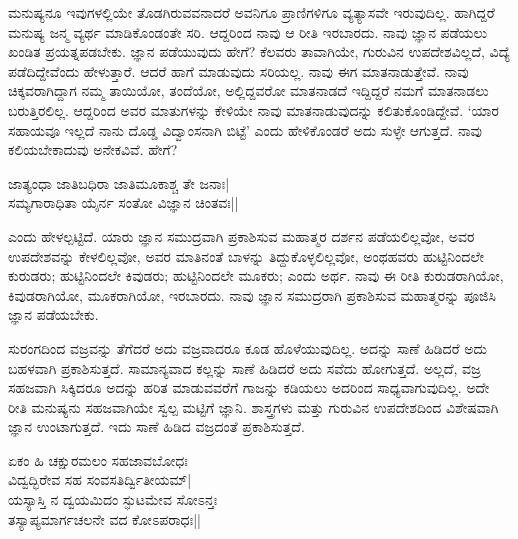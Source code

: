 ಮನುಷ್ಯನೂ ಇವುಗಳಲ್ಲಿಯೇ 
ತೊಡಗಿರುವವನಾದರೆ ಅವನಿಗೂ 
ಪ್ರಾಣಿಗಳಿಗೂ ವ್ಯತ್ಯಾಸವೇ 
ಇರುವುದಿಲ್ಲ. ಹಾಗಿದ್ದರೆ 
ಮನುಷ್ಯ ಜನ್ಮ ವ್ಯರ್ಥ 
ಮಾಡಿಕೊಂಡಂತೇ ಸರಿ. ಆದ್ದರಿಂದ 
ನಾವು ಆ ರೀತಿ ಇರಬಾರದು. ನಾವು 
ಜ್ಞಾನ ಪಡೆಯಲು ಖಂಡಿತ 
ಪ್ರಯತ್ನಪಡಬೇಕು. ಜ್ಞಾನ 
ಪಡೆಯುವುದು ಹೇಗೆ? ಕೆಲವರು 
ತಾವಾಗಿಯೇ, ಗುರುವಿನ 
ಉಪದೇಶವಿಲ್ಲದೆ, ವಿದ್ಯೆ  
ಪಡೆದಿದ್ದೇವೆಂದು 
ಹೇಳುತ್ತಾರೆ. ಆದರೆ ಹಾಗೆ 
ಮಾಡುವುದು ಸರಿಯಲ್ಲ. ನಾವು ಈಗ 
ಮಾತನಾಡುತ್ತೇವೆ. ನಾವು 
ಚಿಕ್ಕವರಾಗಿದ್ದಾಗ ನಮ್ಮ 
ತಾಯಿಯೋ, ತಂದೆಯೋ, 
ಅಲ್ಲಿದ್ದವರೋ ಮಾತನಾಡದೆ 
ಇದ್ದಿದ್ದರೆ ನಮಗೆ ಮಾತನಾಡಲು 
ಬರುತ್ತಿರಲಿಲ್ಲ. ಆದ್ದರಿಂದ 
ಅವರ ಮಾತುಗಳನ್ನು ಕೇಳಿಯೇ 
ನಾವು ಮಾತನಾಡುವುದನ್ನು 
ಕಲಿತುಕೊಂಡಿದ್ದೇವೆ. `ಯಾರ 
ಸಹಾಯವೂ ಇಲ್ಲದೆ ನಾನು ದೊಡ್ಡ 
ವಿದ್ವಾಂಸನಾಗಿ ಬಿಟ್ಟೆ' ಎಂದು 
ಹೇಳಿಕೊಂಡರೆ ಅದು ಸುಳ್ಳೇ ಆಗುತ್ತದೆ. ನಾವು ಕಲಿಯಬೇಕಾದುವು ಅನೇಕವಿವೆ. ಹೇಗೆ?

\begin{shloka}
ಜಾತ್ಯಂಧಾ ಜಾತಿಬಧಿರಾ ಜಾತಿಮೂಕಾಶ್ಚ ತೇ ಜನಾಃ|\\
ಸಮ್ಯಗಾರಾಧಿತಾ ಯೈರ್ನ ಸಂತೋ ವಿಜ್ಞಾನ ಚಿಂತವಃ||
\end{shloka}

ಎಂದು ಹೇಳಲ್ಪಟ್ಟಿದೆ. ಯಾರು 
ಜ್ಞಾನ ಸಮುದ್ರವಾಗಿ 
ಪ್ರಕಾಶಿಸುವ ಮಹಾತ್ಮರ ದರ್ಶನ 
ಪಡೆಯಲಿಲ್ಲವೋ, ಅವರ 
ಉಪದೇಶವನ್ನು ಕೇಳಲಿಲ್ಲವೋ, 
ಅವರ ಮಾತಿನಂತೆ ಬಾಳನ್ನು 
ತಿದ್ದುಕೊಳ್ಳಲಿಲ್ಲವೋ, 
ಅಂಥಹವರು ಹುಟ್ಟಿನಿಂದಲೇ 
ಕುರುಡರು; ಹುಟ್ಟಿನಿಂದಲೇ 
ಕಿವುಡರು; ಹುಟ್ಟಿನಿಂದಲೇ 
ಮೂಕರು; ಎಂದು ಅರ್ಥ. ನಾವು ಈ 
ರೀತಿ ಕುರುಡರಾಗಿಯೋ, 
ಕಿವುಡರಾಗಿಯೋ, ಮೂಕರಾಗಿಯೋ, 
ಇರಬಾರದು. ನಾವು ಜ್ಞಾನ 
ಸಮುದ್ರರಾಗಿ ಪ್ರಕಾಶಿಸುವ ಮಹಾತ್ಮರನ್ನು ಪೂಜಿಸಿ ಜ್ಞಾನ ಪಡೆಯಬೇಕು.

ಸುರಂಗದಿಂದ ವಜ್ರವನ್ನು 
ತೆಗೆದರೆ ಅದು ವಜ್ರವಾದರೂ ಕೂಡ 
ಹೊಳೆಯುವುದಿಲ್ಲ. ಅದನ್ನು 
ಸಾಣೆ ಹಿಡಿದರೆ ಅದು ಬಹಳವಾಗಿ 
ಪ್ರಕಾಶಿಸುತ್ತದೆ. 
ಸಾಮಾನ್ಯವಾದ ಕಲ್ಲನ್ನು ಸಾಣೆ 
ಹಿಡಿದರೆ ಅದು ಸವೆದು 
ಹೋಗುತ್ತದೆ. ಅಲ್ಲದೆ, ವಜ್ರ 
ಸಹಜವಾಗಿ ಸಿಕ್ಕಿದರೂ ಅದನ್ನು 
ಹರಿತ ಮಾಡುವವರೆಗೆ ಗಾಜನ್ನು 
ಕಡಿಯಲು ಅದರಿಂದ 
ಸಾಧ್ಯವಾಗುವುದಿಲ್ಲ. ಅದೇ 
ರೀತಿ ಮನುಷ್ಯನು ಸಹಜವಾಗಿಯೇ 
ಸ್ವಲ್ಪ ಮಟ್ಟಿಗೆ ಜ್ಞಾನಿ. 
ಶಾಸ್ತ್ರಗಳು ಮತ್ತು ಗುರುವಿನ 
ಉಪದೇಶದಿಂದ ವಿಶೇಷವಾಗಿ ಜ್ಞಾನ 
ಉಂಟಾಗುತ್ತದೆ. ಇದು ಸಾಣೆ ಹಿಡಿದ ವಜ್ರದಂತೆ ಪ್ರಕಾಶಿಸುತ್ತದೆ.

\begin{shloka}
ಏಕಂ ಹಿ ಚಕ್ಷುರಮಲಂ ಸಹಜಾವಬೋಧಃ\\
ವಿದ್ವದ್ಭಿರೇವ ಸಹ ಸಂವಸತಿರ್ದ್ವಿತೀಯಮ್|\\
ಯಸ್ಯಾಸ್ತಿ ನ ದ್ವಯಮಿದಂ ಸ್ಫುಟಮೇವ ಸೋಽನ್ತಃ\\
ತಸ್ಯಾಪ್ಯಮಾರ್ಗಚಲನೇ ವದ ಕೋಽಪರಾಧಃ||
\end{shloka}

